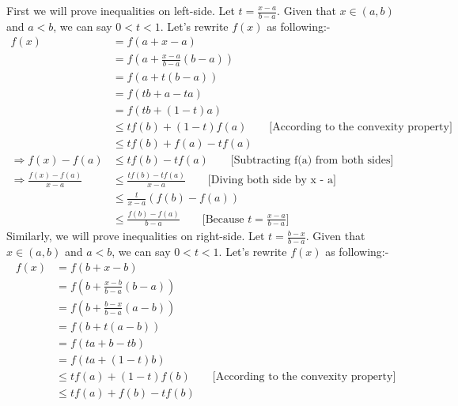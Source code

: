 \documentclass[a4paper,10pt]{article}
\begin{document}
\begin{enumerate}
   First we will prove inequalities on left-side. Let $t = \frac{x-a}{b-a}$. Given that $x \in (a,b)$ and $a < b$, we can say $0 < t < 1$. Let's rewrite $f(x)$ as following:-
    \begin{equation}
       \begin{split}
       f(x) & = f(a + x - a) \\
       & = f(a + \frac{x-a}{b-a}(b-a)) \\
       & = f(a + t(b-a)) \\
       & = f(tb + a - ta) \\
       & = f(tb + (1-t)a) \\ 
       & \leq tf(b) + (1-t)f(a) \hspace{2em} \text{[According to the convexity property]} \\
       & \leq tf(b) + f(a) - tf(a) \\
       \Rightarrow f(x) - f(a) & \leq tf(b) - tf(a) \hspace{2em} \text{[Subtracting f(a) from both sides]} \\
       \Rightarrow \frac{f(x) - f(a)}{x-a} & \leq \frac{tf(b) - tf(a)}{x-a} \hspace{2em} \text{[Diving both side by x - a]} \\
       & \leq \frac{t}{x-a}(f(b) - f(a)) \\
       & \leq \frac{f(b) - f(a)}{b-a} \hspace{2em} \text{[Because $t = \frac{x-a}{b-a}$]}
       \end{split} 
   \end{equation}
   Similarly, we will prove inequalities on right-side. Let $t = \frac{b-x}{b-a}$. Given that $x \in (a,b)$ and $a < b$, we can say $0 < t < 1$. Let's rewrite $f(x)$ as following:-
    \begin{equation}
       \begin{split}
       f(x) & = f(b + x - b) \\
       & = f(b + \frac{x-b}{b-a}(b-a)) \\
       & = f(b + \frac{b-x}{b-a}(a-b)) \\
       & = f(b + t(a-b)) \\
       & = f(ta + b - tb) \\
       & = f(ta + (1-t)b) \\ 
       & \leq tf(a) + (1-t)f(b) \hspace{2em} \text{[According to the convexity property]} \\
       & \leq tf(a) + f(b) - tf(b) \\

\end{split}
\end{equation}
\end{enumerate}
\end{document}
